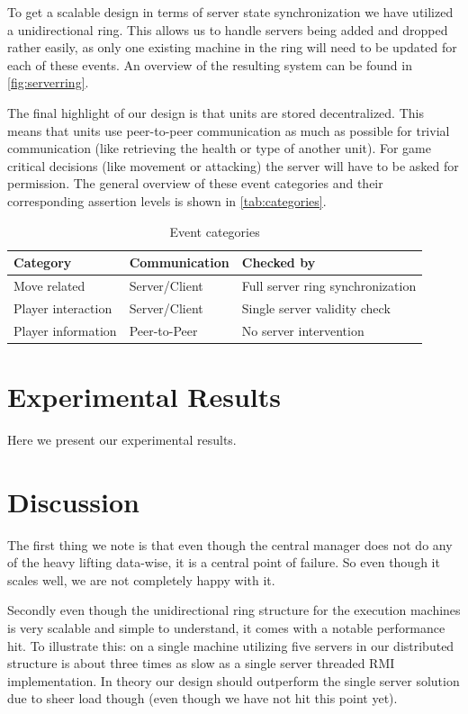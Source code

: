 \documentclass[a4paper,10pt]{article}
\begin{document}
To get a scalable design in terms of server state synchronization we have utilized a unidirectional ring.
This allows us to handle servers being added and dropped rather easily, as only one existing machine in the ring
will need to be updated for each of these events. An overview of the resulting system can be found in \autoref{fig:serverring}.

The final highlight of our design is that units are stored decentralized.
This means that units use peer-to-peer communication as much as possible for trivial communication (like retrieving the health or type of another unit).
For game critical decisions (like movement or attacking) the server will have to be asked for permission.
The general overview of these event categories and their corresponding assertion levels is shown in \autoref{tab:categories}.

\begin{table}
\begin{tabular}{| l | l | l |}
\hline
\textbf{Category} & \textbf{Communication} & \textbf{Checked by} \\
\hline
\hline
Move related & Server/Client & Full server ring synchronization \\
\hline
Player interaction & Server/Client & Single server validity check \\
\hline
Player information & Peer-to-Peer & No server intervention \\
\hline
\end{tabular}
\caption{Event categories}
\label{tab:categories}
\end{table}

\section{Experimental Results}
\label{sec:results}
Here we present our experimental results.

\section{Discussion}
\label{sec:discussion}
The first thing we note is that even though the central manager does not do any of the heavy lifting data-wise, it is a central point of failure.
So even though it scales well, we are not completely happy with it.

Secondly even though the unidirectional ring structure for the execution machines is very scalable and simple to understand,
it comes with a notable performance hit.
To illustrate this: on a single machine utilizing five servers in our distributed structure is about three times as slow as a single server threaded RMI implementation.
In theory our design should outperform the single server solution due to sheer load though (even though we have not hit this point yet).
\end{document}
